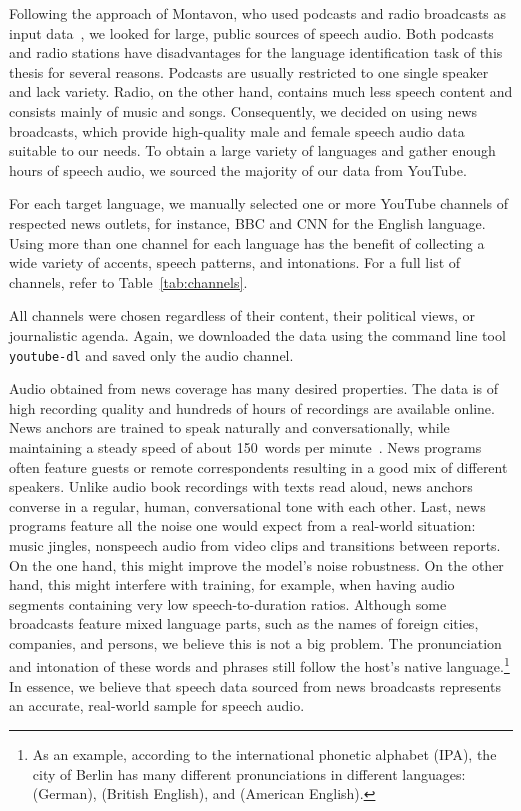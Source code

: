 	Following the approach of Montavon, who used podcasts and radio broadcasts as input data~\cite{montavon2009deep}, we looked for large, public sources of speech audio. Both podcasts and radio stations have disadvantages for the language identification task of this thesis for several reasons. Podcasts are usually restricted to one single speaker and lack variety. Radio, on the other hand, contains much less speech content and consists mainly of music and songs. Consequently, we decided on using news broadcasts, which provide high-quality male and female speech audio data suitable to our needs. To obtain a large variety of languages and gather enough hours of speech audio, we sourced the majority of our data from YouTube.

	For each target language, we manually selected one or more YouTube channels of respected news outlets, for instance, BBC and CNN for the English language. Using more than one channel for each language has the benefit of collecting a wide variety of accents, speech patterns, and intonations. For a full list of channels, refer to Table~\ref{tab:channels}.

	All channels were chosen regardless of their content, their political views, or journalistic agenda. Again, we downloaded the data using the command line tool \texttt{youtube-dl} and saved only the audio channel.

  	Audio obtained from news coverage has many desired properties. The data is of high recording quality and hundreds of hours of recordings are available online. News anchors are trained to speak naturally and conversationally, while maintaining a steady speed of about \num{150}~words per minute~\cite{Kantilaftis2016}. News programs often feature guests or remote correspondents resulting in a good mix of different speakers. Unlike audio book recordings with texts read aloud, news anchors converse in a regular, human, conversational tone with each other. Last, news programs feature all the noise one would expect from a real-world situation: music jingles, nonspeech audio from video clips and transitions between reports. On the one hand, this might improve the model's noise robustness. On the other hand, this might interfere with training, for example, when having audio segments containing very low speech-to-duration ratios. Although some broadcasts feature mixed language parts, such as the names of foreign cities, companies, and persons, we believe this is not a big problem. The pronunciation and intonation of these words and phrases still follow the host's native language.\footnote{As an example, according to the international phonetic alphabet (IPA), the city of Berlin has many different pronunciations in different languages:  (German),  (British English), and  (American English).} In essence, we believe that speech data sourced from news broadcasts represents an accurate, real-world sample for speech audio.

